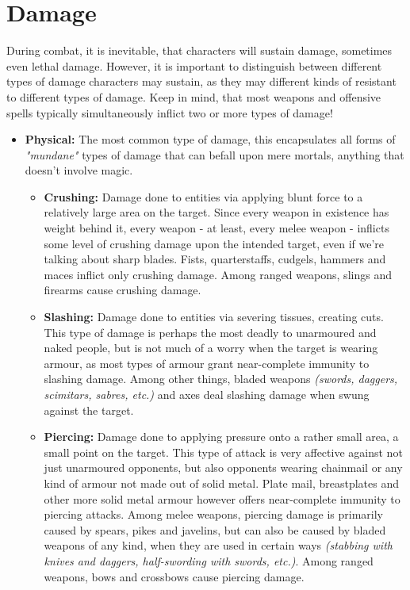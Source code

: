 \documentclass[openany,11pt,a4paper]{book}
\begin{document}
\section{Damage}
During combat, it is inevitable, that characters will sustain damage, sometimes even lethal damage. However, it is important to distinguish between different types of damage characters may sustain, as they may different kinds of resistant to different types of damage. Keep in mind, that most weapons and offensive spells typically simultaneously inflict two or more types of damage!
\begin{itemize}
\item \textbf{Physical:} The most common type of damage, this encapsulates all forms of \textit{"mundane"} types of damage that can befall upon mere mortals, anything that doesn't involve magic.
	\begin{itemize}[label=$\star$]
		\item \textbf{Crushing:} Damage done to entities via applying blunt force to a relatively large area on the target. Since every weapon in existence has weight behind it, every weapon - at least, every melee weapon - inflicts some level of crushing damage upon the intended target, even if we're talking about sharp blades. Fists, quarterstaffs, cudgels, hammers and maces inflict only crushing damage. Among ranged weapons, slings and firearms cause crushing damage.
		\item \textbf{Slashing:} Damage done to entities via severing tissues, creating cuts. This type of damage is perhaps the most deadly to unarmoured and naked people, but is not much of a worry when the target is wearing armour, as most types of armour grant near-complete immunity to slashing damage. Among other things, bladed weapons \textit{(swords, daggers, scimitars, sabres, etc.)} and axes deal slashing damage when swung against the target.
		\item \textbf{Piercing:} Damage done to applying pressure onto a rather small area, a small point on the target. This type of attack is very affective against not just unarmoured opponents, but also opponents wearing chainmail or any kind of armour not made out of solid metal. Plate mail, breastplates and other more solid metal armour however offers near-complete immunity to piercing attacks. Among melee weapons, piercing damage is primarily caused by spears, pikes and javelins, but can also be caused by bladed weapons of any kind, when they are used in certain ways \textit{(stabbing with knives and daggers, half-swording with swords, etc.)}. Among ranged weapons, bows and crossbows cause piercing damage.

\end{itemize}
\end{itemize}
\end{document}
